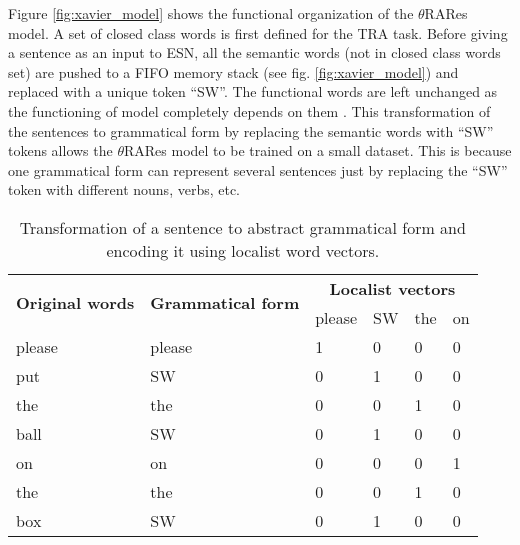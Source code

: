 Figure \ref{fig:xavier_model} shows the functional organization of the $\theta$RARes model. A set of closed class words is first defined for the TRA task. Before giving a sentence as an input to ESN, all the semantic words (not in closed class words set) are pushed to a FIFO memory stack (see fig. \ref{fig:xavier_model}) and replaced with a unique token ``SW''. The functional words are left unchanged as the functioning of model completely depends on them \cite{xavier:2013:RT}. This transformation of the sentences to grammatical form by replacing the semantic words with ``SW'' tokens allows the $\theta$RARes model to be trained on a small dataset. This is because one grammatical form can represent several sentences just by replacing the ``SW'' token with different nouns, verbs, etc.

\begin{table}[hbtp]
\centering
\caption[Transformation of a sentence to abstract grammatical form and encoding it using localist word vectors.]{Transformation of a sentence to abstract grammatical form and encoding it using localist word vectors.}
\begin{tabular}{|l|l|l|l|l|l|}
\hline
\multicolumn{1}{|c|}{\multirow{2}{*}{\textbf{Original words}}} & \multicolumn{1}{c|}{\multirow{2}{*}{\textbf{Grammatical form}}} & \multicolumn{4}{c|}{\textbf{Localist vectors}} \\ \cline{3-6} 
\multicolumn{1}{|c|}{}                                         & \multicolumn{1}{c|}{}                                           & please     & SW     & the     & on    \\ \hline
please                                                         & please                                                          & 1          & 0      & 0       & 0     \\ \hline
put                                                            & SW                                                              & 0          & 1      & 0       & 0     \\ \hline
the                                                            & the                                                             & 0          & 0      & 1       & 0     \\ \hline
ball                                                           & SW                                                              & 0          & 1      & 0       & 0     \\ \hline
on                                                             & on                                                              & 0          & 0      & 0       & 1     \\ \hline
the                                                            & the                                                             & 0          & 0      & 1       & 0     \\ \hline
box                                                            & SW                                                              & 0          & 1      & 0       & 0     \\ \hline
\end{tabular}
\label{tab:localist_representation}
\end{table}

